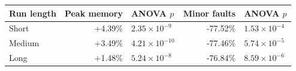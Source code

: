 \begin{tabular}{lrlrl}\toprule
Run length & Peak memory & ANOVA $p$ & Minor faults & ANOVA $p$\\\midrule
Short & +4.39\% & $2.35\times10^{-9}$ & -77.52\% & $1.53\times10^{-4}$\\
Medium & +3.49\% & $4.21\times10^{-10}$ & -77.46\% & $5.74\times10^{-5}$\\
Long & +1.48\% & $5.24\times10^{-8}$ & -76.84\% & $8.59\times10^{-6}$\\
\bottomrule\end{tabular}\par